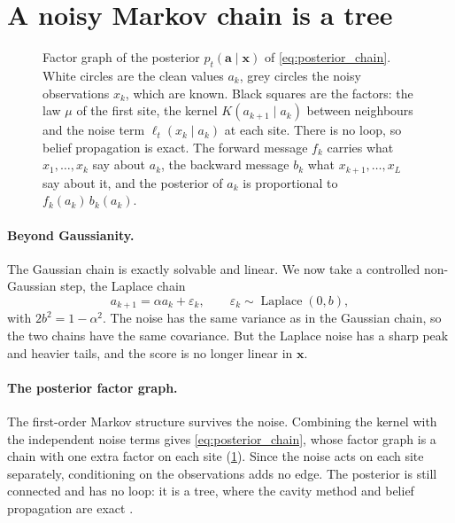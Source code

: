 \section{A noisy Markov chain is a tree}
\label{sec:tree}

\begin{figure}[t]
  \centering
  
  \caption{Factor graph of the posterior $p_t(\mathbf a\mid\mathbf x)$ of \cref{eq:posterior_chain}. White circles are
  the clean values $a_k$, grey circles the noisy observations $x_k$, which are known. Black squares are the factors: the
  law $\mu$ of the first site, the kernel $K(a_{k+1}\mid a_k)$ between neighbours and the noise term
  $\ell_t(x_k\mid a_k)$ at each site. There is no loop, so belief propagation is exact. The forward message $f_k$ carries
  what $x_1,\ldots,x_k$ say about $a_k$, the backward message $b_k$ what $x_{k+1},\ldots,x_L$ say about it, and the
  posterior of $a_k$ is proportional to $f_k(a_k)\,b_k(a_k)$.}
  \label{fig:factor-graph}
\end{figure}

\paragraph{Beyond Gaussianity.}
The Gaussian chain is exactly solvable and linear. We now take a controlled non-Gaussian step, the Laplace chain
\begin{equation}
    a_{k+1}=\alpha a_k+\varepsilon_k,
    \qquad
    \varepsilon_k\sim\operatorname{Laplace}(0,b),
    \label{eq:laplace_chain}
\end{equation}
with $2b^2=1-\alpha^2$. The noise has the same variance as in the Gaussian chain, so the two chains have the same
covariance. But the Laplace noise has a sharp peak and heavier tails, and the score is no longer linear in $\mathbf x$.

\paragraph{The posterior factor graph.}
The first-order Markov structure survives the noise. Combining the kernel with the independent noise terms gives
\cref{eq:posterior_chain}, whose factor graph is a chain with one extra factor on each site (\cref{fig:factor-graph}).
Since the noise acts on each site separately, conditioning on the observations adds no edge. The posterior is still
connected and has no loop: it is a tree, where the cavity method and belief propagation are exact
\cite{mezard2001bethe,mezard2006reconstruction,mezard2009information}.

